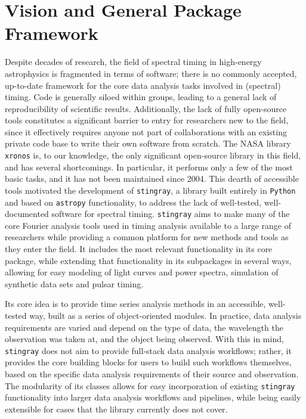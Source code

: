 \documentclass[twocolumn]{aastex62}
\newcommand{\python}{\texttt{Python}\xspace}
\newcommand{\stingray}{\texttt{stingray}\xspace}
\newcommand{\astropy}{\texttt{astropy}\xspace}
\begin{document}

\section{Vision and General Package Framework}
\label{sec:vision}

Despite decades of research, the field of spectral timing in high-energy astrophysics is fragmented in terms of software; there is no commonly accepted, up-to-date framework for the core data analysis tasks involved in (spectral) timing. Code is generally siloed within groups, leading to a general lack of reproducibility of scientific results. Additionally, the lack of fully open-source tools constitutes a significant barrier to entry for researchers new to the field, since it effectively requires anyone not part of collaborations with an existing private code base to write their own software from scratch. 
The NASA library \texttt{xronos} is, to our knowledge, the only significant open-source library in this field, and has several shortcomings. 
In particular, it performs only a few of the most basic tasks, and it has not been maintained since 2004. 
This dearth of accessible tools motivated the development of \stingray, a library built entirely in \python and based on \astropy functionality, to address the lack of well-tested, well-documented software for spectral timing. 
\stingray aims to make many of the core Fourier analysis tools used in timing analysis available to a large range of researchers while providing a common platform for new methods and tools as they enter the field. 
It includes the most relevant functionality in its core package, while extending that functionality in its subpackages in several ways, allowing for easy modeling of light curves and power spectra, simulation of synthetic data sets and pulsar timing. 

Its core idea is to provide time series analysis methods in an accessible, well-tested way, built as a series of object-oriented modules. In practice, data analysis requirements are varied and depend on the type of data, the wavelength the observation was taken at, and the object being observed. With this in mind, \stingray does not aim to provide full-stack data analysis workflows; rather, it provides the core building blocks for users to build such workflows themselves, based on the specific data analysis requirements of their source and observation. 
The modularity of its classes allows for easy incorporation of existing \stingray functionality into larger data analysis workflows and pipelines, while being easily extensible for cases that the library currently does not cover. 
\end{document}
